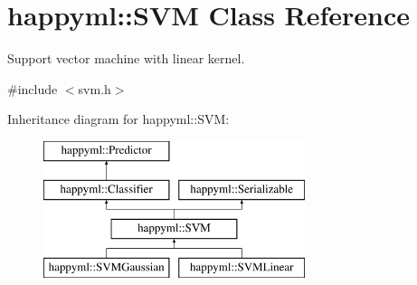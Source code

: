 \hypertarget{classhappyml_1_1SVM}{}\section{happyml\+:\+:S\+VM Class Reference}
\label{classhappyml_1_1SVM}


Support vector machine with linear kernel.  




{\ttfamily \#include $<$svm.\+h$>$}

Inheritance diagram for happyml\+:\+:S\+VM\+:\begin{figure}[H]
\begin{center}
\leavevmode
\includegraphics[height=4.000000cm]{classhappyml_1_1SVM}
\end{center}
\end{figure}
